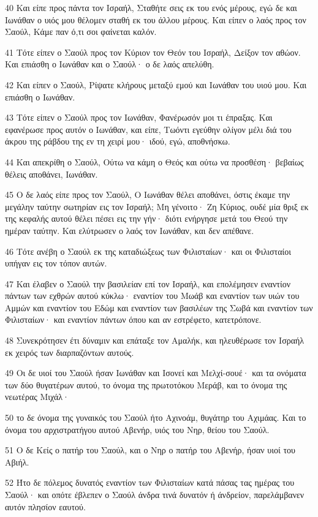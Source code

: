 \par 40 Και είπε προς πάντα τον Ισραήλ, Σταθήτε σεις εκ του ενός μέρους, εγώ δε και Ιωνάθαν ο υιός μου θέλομεν σταθή εκ του άλλου μέρους. Και είπεν ο λαός προς τον Σαούλ, Κάμε παν ό,τι σοι φαίνεται καλόν.
\par 41 Τότε είπεν ο Σαούλ προς τον Κύριον τον Θεόν του Ισραήλ, Δείξον τον αθώον. Και επιάσθη ο Ιωνάθαν και ο Σαούλ· ο δε λαός απελύθη.
\par 42 Και είπεν ο Σαούλ, Ρίψατε κλήρους μεταξύ εμού και Ιωνάθαν του υιού μου. Και επιάσθη ο Ιωνάθαν.
\par 43 Τότε είπεν ο Σαούλ προς τον Ιωνάθαν, Φανέρωσόν μοι τι έπραξας. Και εφανέρωσε προς αυτόν ο Ιωνάθαν, και είπε, Τωόντι εγεύθην ολίγον μέλι διά του άκρου της ράβδου της εν τη χειρί μου· ιδού, εγώ, αποθνήσκω.
\par 44 Και απεκρίθη ο Σαούλ, Ούτω να κάμη ο Θεός και ούτω να προσθέση· βεβαίως θέλεις αποθάνει, Ιωνάθαν.
\par 45 Ο δε λαός είπε προς τον Σαούλ, Ο Ιωνάθαν θέλει αποθάνει, όστις έκαμε την μεγάλην ταύτην σωτηρίαν εις τον Ισραήλ; Μη γένοιτο· Ζη Κύριος, ουδέ μία θριξ εκ της κεφαλής αυτού θέλει πέσει εις την γήν· διότι ενήργησε μετά του Θεού την ημέραν ταύτην. Και ελύτρωσεν ο λαός τον Ιωνάθαν, και δεν απέθανε.
\par 46 Τότε ανέβη ο Σαούλ εκ της καταδιώξεως των Φιλισταίων· και οι Φιλισταίοι υπήγαν εις τον τόπον αυτών.
\par 47 Και έλαβεν ο Σαούλ την βασιλείαν επί τον Ισραήλ, και επολέμησεν εναντίον πάντων των εχθρών αυτού κύκλω· εναντίον του Μωάβ και εναντίον των υιών του Αμμών και εναντίον του Εδώμ και εναντίον των βασιλέων της Σωβά και εναντίον των Φιλισταίων· και εναντίον πάντων όπου και αν εστρέφετο, κατετρόπονε.
\par 48 Συνεκρότησεν έτι δύναμιν και επάταξε τον Αμαλήκ, και ηλευθέρωσε τον Ισραήλ εκ χειρός των διαρπαζόντων αυτούς.
\par 49 Οι δε υιοί του Σαούλ ήσαν Ιωνάθαν και Ισονεί και Μελχί-σουέ· και τα ονόματα των δύο θυγατέρων αυτού, το όνομα της πρωτοτόκου Μεράβ, και το όνομα της νεωτέρας Μιχάλ·
\par 50 το δε όνομα της γυναικός του Σαούλ ήτο Αχινοάμ, θυγάτηρ του Αχιμάας. Και το όνομα του αρχιστρατήγου αυτού Αβενήρ, υιός του Νηρ, θείου του Σαούλ.
\par 51 Ο δε Κείς ο πατήρ του Σαούλ, και ο Νηρ ο πατήρ του Αβενήρ, ήσαν υιοί του Αβιήλ.
\par 52 Ήτο δε πόλεμος δυνατός εναντίον των Φιλισταίων κατά πάσας τας ημέρας του Σαούλ· και οπότε έβλεπεν ο Σαούλ άνδρα τινά δυνατόν ή άνδρείον, παρελάμβανεν αυτόν πλησίον εαυτού.

